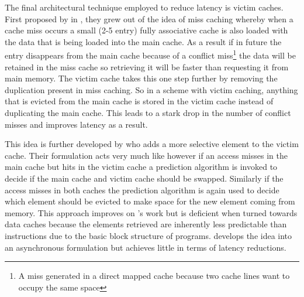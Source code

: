 The final architectural technique employed to reduce latency is victim caches. First proposed by \citet{jouppiImprovingDirectmappedCache1990} in \citeyear{jouppiImprovingDirectmappedCache1990}, they grew out of the idea of miss caching whereby when a cache miss occurs a small (2-5 entry) fully associative cache is also loaded with the data that is being loaded into the main cache. As a result if in future the entry disappears from the main cache because of a conflict miss\footnote{A miss generated in a direct mapped cache because two cache lines want to occupy the same space} the data will be retained in the miss cache so retrieving it will be faster than requesting it from main memory. The victim cache takes this one step further by removing the duplication present in miss caching. So in a scheme with victim caching, anything that is evicted from the main cache is stored in the victim cache instead of duplicating the main cache. This leads to a stark drop in the number of conflict misses and improves latency as a result. 

This idea is further developed by \cite{stiliadisSelectiveVictimCaching1997} who adds a more selective element to the victim cache. Their formulation acts very much like \citeauthor{jouppiImprovingDirectmappedCache1990} however if an access misses in the main cache but hits in the victim cache a prediction algorithm is invoked to decide if the main cache and victim cache should be swapped. Similarly if the access misses in both caches the prediction algorithm is again used to decide which element should be evicted to make space for the new element coming from memory. This approach improves on \citeauthor{jouppiImprovingDirectmappedCache1990}'s work but is deficient when turned towards data caches because the elements retrieved are inherently less predictable than instructions due to the basic block structure of programs. \citet{hormdeeAsynchronousVictimCache2002} develops the idea into an asynchronous formulation but achieves little in terms of latency reductions.

